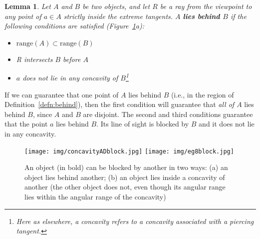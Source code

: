 \documentclass[10pt,twocolumn]{article}
\newcommand{\QED}{\vrule height 1.4ex width 1.0ex depth -.1ex\ \vspace{.3in}} %
\newcommand{\prf}{\noindent{{\bf Proof}:\ \ \ }}
\newtheorem{lemma}{Lemma}
\begin{document}
\begin{lemma}
\label{lem:extremeblock}
Let $A$ and $B$ be two objects, and
let $R$ be a ray from the viewpoint to any point of $a \in A$ 
strictly inside the extreme tangents.
$A$ {\bf lies behind $B$}
if the following conditions are satisfied (Figure~\ref{fig:block}a):
\begin{itemize}
\item $\mbox{range}(A) \subset \mbox{range}(B)$
\item R intersects $B$ before $A$
\item $a$ does not lie in any concavity of $B$\footnote{Here as elsewhere, a concavity
    refers to a concavity associated with a piercing tangent.}
\end{itemize}
\end{lemma}
\prf
If we can guarantee that one point of $A$ lies behind $B$
(i.e., in the region of Definition~\ref{defn:behind}),
then the first condition will guarantee that {\em all of $A$} lies behind $B$,
since $A$ and $B$ are disjoint.
The second and third conditions guarantee that the point $a$ lies behind $B$.
Its line of sight is blocked by $B$ and it does not lie in any concavity.
\QED

\vspace{-.3in}

\begin{figure}[h]
\begin{center}
\texttt{[image: img/concavityADblock.jpg]}
\texttt{[image: img/eg8block.jpg]}
\end{center}
\caption{An object (in bold) can be blocked by another in two ways: 
         (a) an object lies behind another;
         (b) an object lies inside a concavity of another 
             (the other object does not, even though its angular range lies within
              the angular range of the concavity)}
\label{fig:block}
\end{figure}
\end{document}
